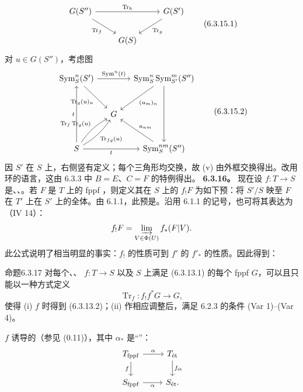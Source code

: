 \[\begin{tikzcd}G(S'')\arrow[rr,"\operatorname{Tr}_h"]\arrow[dr,"\operatorname{Tr}_f"']&&G(S')\arrow[dl,"\operatorname{Tr}_g"]\\&G(S)&\end{tikzcd}\tag{6.3.15.1}\]
对 $u\in G(S'')$，考虑图
\[\begin{tikzcd}[column sep=small,row sep=large]
\operatorname{Sym}_S^n(S')\arrow[rr,"\operatorname{Sym}^n(t)"]\arrow[dr,"\operatorname{Tr}_g(u)_n"']&&\operatorname{Sym}_S^n\operatorname{Sym}_{S'}^m(S'')\arrow[dl,"(u_m)_n"]\arrow[dd]\\
&G&\\S\arrow[uu,"t"]\arrow[rr,"t"']\arrow[ur,bend left=12,"\operatorname{Tr}_f\operatorname{Tr}_g(u)"]\arrow[ur,bend right=12,"\operatorname{Tr}_{fg}(u)"']&&\operatorname{Sym}_S^{nm}(S'')\arrow[ul,"u_{nm}"']
\end{tikzcd}\tag{6.3.15.2}\]
因 $S'$ 在 $S$ 上，右侧竖有定义；每个三角形均交换，故 (v) 由外框交换得出。改用环的语言，这由 6.3.3 中 $B=E$、$C=F$ 的特例得出。
\textbf{6.3.16。} 现在设 $f:T\to S$ 是、、。若 $F$ 是 $T$ 上的 fppf ，则定义其在 $S$ 上的 $f_!F$ 为如下预：将 $S'/S$ 映至 $F$ 在 $T'$ 上在 $S'$ 上的全体。由 6.1.1，此预是。沿用 6.1.1 的记号，也可将其表达为（IV 14）：
\[f_!F=\varinjlim_{V\in\Phi(U)}f_*(F|V).\]
此公式说明了相当明显的事实：$f_!$ 的性质可到 $f'$ 的 $f'_*$ 的性质。因此得到：
\begin{SGAresult}{命题}{6.3.17}
对每个、、 $f:T\to S$ 以及 $S$ 上满足 (6.3.13.1) 的每个 fppf  $G$，可以且只能以一种方式定义
\[\operatorname{Tr}_f:f_!f^*G\longrightarrow G,\]
使得 (i) $f$ 时得到 (6.3.13.2)；(ii) 作相应调整后，满足 6.2.3 的条件 (Var 1)--(Var 4)。
\end{SGAresult}
 $f$ 诱导的（参见 (0.11)），其中 $\alpha_*$ 是“”：
\[\begin{tikzcd}T_{\mathrm{fppf}}\arrow[r,"\alpha"]\arrow[d,"f"']&T_{\text{ét}}\arrow[d,"f_{\text{ét}}"]\\S_{\mathrm{fppf}}\arrow[r,"\alpha"']&S_{\text{ét}}.\end{tikzcd}\]
